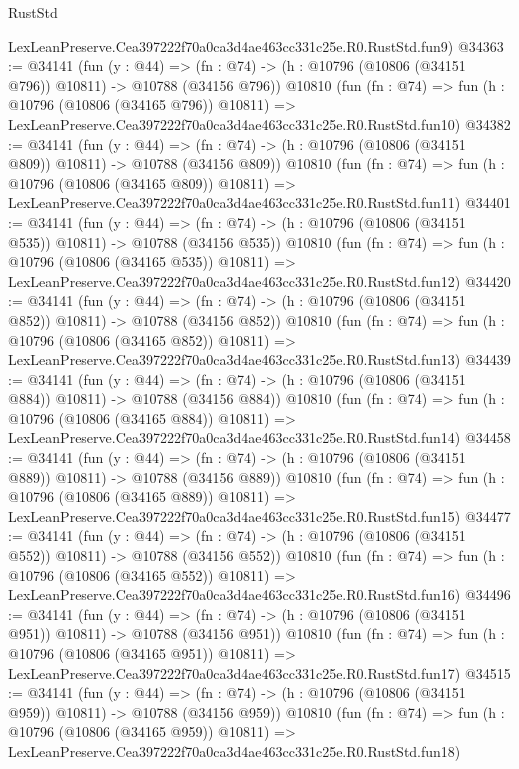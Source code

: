 \begin{lexlean}{RustStd}
\begin{coremodule}
    LexLeanPreserve.Cea397222f70a0ca3d4ae463cc331c25e.R0.RustStd.fun9)
@34363 := @34141
    (fun (y : @44) =>
    (fn : @74) -> (h : @10796 (@10806 (@34151 @796)) @10811) -> @10788 (@34156 @796))
    @10810
    (fun (fn : @74) =>
    fun (h : @10796 (@10806 (@34165 @796)) @10811) =>
    LexLeanPreserve.Cea397222f70a0ca3d4ae463cc331c25e.R0.RustStd.fun10)
@34382 := @34141
    (fun (y : @44) =>
    (fn : @74) -> (h : @10796 (@10806 (@34151 @809)) @10811) -> @10788 (@34156 @809))
    @10810
    (fun (fn : @74) =>
    fun (h : @10796 (@10806 (@34165 @809)) @10811) =>
    LexLeanPreserve.Cea397222f70a0ca3d4ae463cc331c25e.R0.RustStd.fun11)
@34401 := @34141
    (fun (y : @44) =>
    (fn : @74) -> (h : @10796 (@10806 (@34151 @535)) @10811) -> @10788 (@34156 @535))
    @10810
    (fun (fn : @74) =>
    fun (h : @10796 (@10806 (@34165 @535)) @10811) =>
    LexLeanPreserve.Cea397222f70a0ca3d4ae463cc331c25e.R0.RustStd.fun12)
@34420 := @34141
    (fun (y : @44) =>
    (fn : @74) -> (h : @10796 (@10806 (@34151 @852)) @10811) -> @10788 (@34156 @852))
    @10810
    (fun (fn : @74) =>
    fun (h : @10796 (@10806 (@34165 @852)) @10811) =>
    LexLeanPreserve.Cea397222f70a0ca3d4ae463cc331c25e.R0.RustStd.fun13)
@34439 := @34141
    (fun (y : @44) =>
    (fn : @74) -> (h : @10796 (@10806 (@34151 @884)) @10811) -> @10788 (@34156 @884))
    @10810
    (fun (fn : @74) =>
    fun (h : @10796 (@10806 (@34165 @884)) @10811) =>
    LexLeanPreserve.Cea397222f70a0ca3d4ae463cc331c25e.R0.RustStd.fun14)
@34458 := @34141
    (fun (y : @44) =>
    (fn : @74) -> (h : @10796 (@10806 (@34151 @889)) @10811) -> @10788 (@34156 @889))
    @10810
    (fun (fn : @74) =>
    fun (h : @10796 (@10806 (@34165 @889)) @10811) =>
    LexLeanPreserve.Cea397222f70a0ca3d4ae463cc331c25e.R0.RustStd.fun15)
@34477 := @34141
    (fun (y : @44) =>
    (fn : @74) -> (h : @10796 (@10806 (@34151 @552)) @10811) -> @10788 (@34156 @552))
    @10810
    (fun (fn : @74) =>
    fun (h : @10796 (@10806 (@34165 @552)) @10811) =>
    LexLeanPreserve.Cea397222f70a0ca3d4ae463cc331c25e.R0.RustStd.fun16)
@34496 := @34141
    (fun (y : @44) =>
    (fn : @74) -> (h : @10796 (@10806 (@34151 @951)) @10811) -> @10788 (@34156 @951))
    @10810
    (fun (fn : @74) =>
    fun (h : @10796 (@10806 (@34165 @951)) @10811) =>
    LexLeanPreserve.Cea397222f70a0ca3d4ae463cc331c25e.R0.RustStd.fun17)
@34515 := @34141
    (fun (y : @44) =>
    (fn : @74) -> (h : @10796 (@10806 (@34151 @959)) @10811) -> @10788 (@34156 @959))
    @10810
    (fun (fn : @74) =>
    fun (h : @10796 (@10806 (@34165 @959)) @10811) =>
    LexLeanPreserve.Cea397222f70a0ca3d4ae463cc331c25e.R0.RustStd.fun18)

\end{coremodule}
\end{lexlean}
